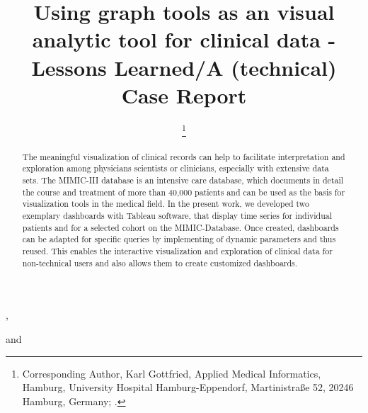 \documentclass[aac]{iosart2x}
\begin{document}
\begin{frontmatter}

{\centering \title{Using graph tools as an visual analytic tool for clinical data - 
Lessons Learned/A (technical) Case Report
}}


\author[A]{ %
\thanks{Corresponding Author, Karl Gottfried, Applied Medical Informatics, Hamburg, University Hospital Hamburg-Eppendorf, Martinistraße 52, 20246 Hamburg, Germany;  .}},
\author[A]{ }
and
\author[A]{ }
\address[A]{Applied Medical Informatics, , Germany, ,
}
\address[B]{Department first, ,
Abbreviate US states, }


\begin{abstract}

The meaningful visualization of clinical records can help to facilitate interpretation and exploration among physicians scientists or clinicians, especially with extensive data sets. The MIMIC-III database is an intensive care database, which documents in detail the course and treatment of more than 40,000 patients and can be used as the basis for visualization tools in the medical field. In the present work, we developed two exemplary dashboards with Tableau software, that display time series for individual patients and for a selected cohort on the MIMIC-Database. Once created, dashboards can be adapted for specific queries by implementing of dynamic parameters and thus reused. This enables the interactive visualization and exploration of clinical data for non-technical users and also allows them to create customized dashboards.
\end{abstract}

\begin{keyword}
\end{keyword}

\end{frontmatter}
\end{document}
